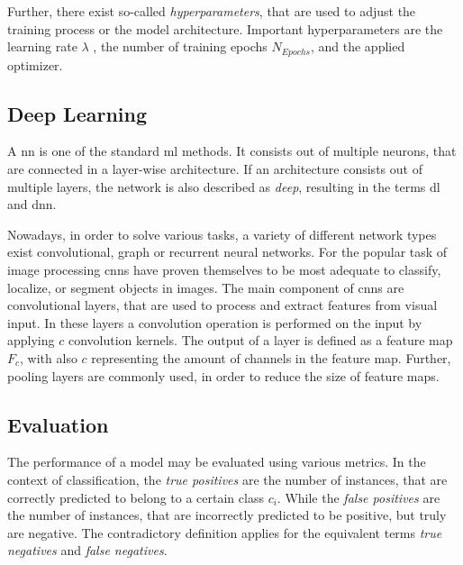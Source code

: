 Further, there exist so-called \textit{hyperparameters}, that are used to adjust the training process or the model architecture.
Important hyperparameters are the learning rate $\lambda$ , the number of training epochs $N_{Epochs}$, and the applied optimizer.


\subsection{Deep Learning}\label{ord:ch2:sec1:subsec2}

A \gls{nn} is one of the standard \gls{ml} methods.
It consists out of multiple neurons, that are connected in a layer-wise architecture.
If an architecture consists out of multiple layers, the network is also described as \textit{deep}, resulting in the terms \gls{dl} and \gls{dnn}.

Nowadays, in order to solve various tasks, a variety of different network types exist \eg convolutional, graph or recurrent neural networks.
For the popular task of image processing \glspl{cnn} have proven themselves to be most adequate to classify, localize, or segment objects in images.
The main component of \glspl{cnn} are convolutional layers, that are used to process and extract features from visual input.
In these layers a convolution operation is performed on the input by applying $c$ convolution kernels.
The output of a layer is defined as a feature map $F_c$, with also $c$ representing the amount of channels in the feature map.
Further, pooling layers are commonly used, in order to reduce the size of feature maps.


\subsection{Evaluation}\label{ord:ch2:sec1:subsec3}

The performance of a model may be evaluated using various metrics.
In the context of classification, the \textit{true positives} are the number of instances, that are correctly predicted to belong to a certain class $c_i$.
While the \textit{false positives} are the number of instances, that are incorrectly predicted to be positive, but truly are negative.
The contradictory definition applies for the equivalent terms \textit{true negatives} and \textit{false negatives}.

